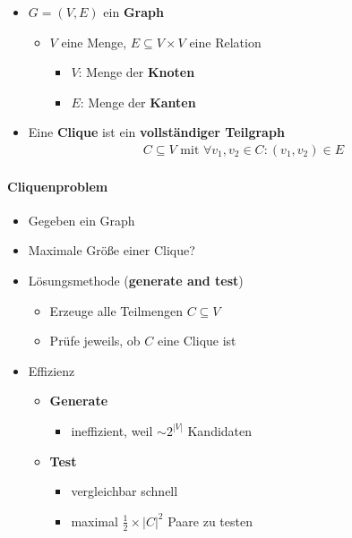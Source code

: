 \documentclass{scrartcl}
\begin{document}
\begin{itemize}
	\item $G=(V,E)$ ein \textbf{Graph}
	\begin{itemize}
		\item $V$ eine Menge, $E \subseteq V \times V$ eine Relation
		\begin{itemize}
			\item $V$: Menge der \textbf{Knoten}
			\item $E$: Menge der \textbf{Kanten}
		\end{itemize}
	\end{itemize}
	\item Eine \textbf{Clique} ist ein \textbf{vollständiger Teilgraph}
	\begin{align*}
		C \subseteq V \text{ mit } \forall v_1,v_2 \in C: (v_1,v_2) \in E
	\end{align*}
\end{itemize}

\paragraph{Cliquenproblem}

\begin{itemize}
	\item Gegeben ein Graph
	\item Maximale Größe einer Clique?
	\item Lösungsmethode (\textbf{generate and test})
	\begin{itemize}
		\item Erzeuge alle Teilmengen $C \subseteq V$
		\item Prüfe jeweils, ob $C$ eine Clique ist
	\end{itemize}
	\item Effizienz
	\begin{itemize}
		\item \textbf{Generate}
		\begin{itemize}
			\item ineffizient, weil $\sim 2^{|V|}$ Kandidaten
		\end{itemize}
		\item \textbf{Test}
		\begin{itemize}
			\item vergleichbar schnell
			\item maximal $\frac{1}{2} \times |C|^2$ Paare zu testen
		\end{itemize}
	\end{itemize}
\end{itemize}
\end{document}
